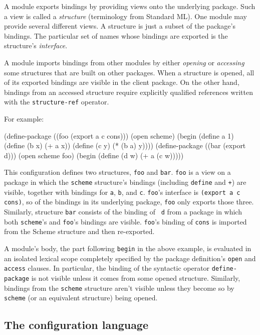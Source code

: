 A module exports bindings by providing views onto the underlying
package.  Such a view is called a {\em structure} (terminology from
Standard ML).  One module may provide several different views.  A
structure is just a subset of the package's bindings.  The particular
set of names whose bindings are exported is the structure's {\em
interface}.

A module imports bindings from other modules by either {\em opening}
or {\em accessing} some structures that are built on other packages.
When a structure is opened, all of its exported bindings are visible
in the client package.  On the other hand, bindings from an accessed
structure require explicitly qualified references written with the
{\tt structure-ref} operator.

For example:
\begin{code}
    (define-package ((foo (export a c cons)))
      (open scheme)
      (begin (define a 1)
	     (define (b x) (+ a x))
	     (define (c y) (* (b a) y))))
\codeskip
    (define-package ((bar (export d)))
      (open scheme foo)
      (begin (define (d w) (+ a (c w)))))
\end{code}
This configuration defines two structures, {\tt foo} and {\tt bar}.
{\tt foo} is a view on a package in which the {\tt scheme} structure's
bindings (including {\tt define} and {\tt +}) are visible, together
with bindings for {\tt a}, {\tt b},
and {\tt c}.  {\tt foo}'s interface is {\tt (export a c cons)}, so of
the bindings in its underlying package, {\tt foo} only exports those
three.  Similarly, structure {\tt bar} consists of the binding of {\tt
d} from a package in which both {\tt scheme}'s and {\tt foo}'s
bindings are visible.  {\tt foo}'s binding of {\tt cons} is imported
from the Scheme structure and then re-exported.

A module's body, the part following {\tt begin} in the above example,
is evaluated in an isolated lexical scope completely specified by the
package definition's {\tt open} and {\tt access} clauses.  In
particular, the binding of the syntactic operator {\tt define-package}
is not visible unless it comes from some opened structure.  Similarly,
bindings from the {\tt scheme} structure aren't visible unless they
become so by {\tt scheme} (or an equivalent structure) being opened.


\subsection*{The configuration language}

